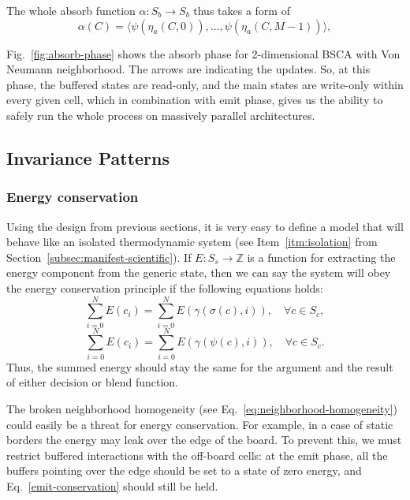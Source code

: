 \documentclass[a4paper,12pt,tikz,UTF8]{article}
\begin{document}
    The whole absorb function $\alpha: S_b \to S_b$ thus takes a form of
    \begin{equation}
      \alpha(C) = \langle \psi(\eta_a(C, 0)), ..., \psi(\eta_a(C, M - 1)) \rangle,
    \end{equation}

    Fig.~\ref{fig:absorb-phase} shows the absorb phase for 2-dimensional BSCA with Von Neumann neighborhood. The arrows are indicating the updates. So, at this phase, the buffered states are read-only, and the main states are write-only within every given cell, which in combination with emit phase, gives us the ability to safely run the whole process on massively parallel architectures.

  \subsection{Invariance Patterns}

  \subsubsection{Energy conservation}
    \label{subsec:energy-conservation}
    Using the design from previous sections, it is very easy to define a model that will behave like an isolated thermodynamic system (see Item~\ref{itm:isolation} from Section~\ref{subsec:manifest-scientific}). If $E: S_s \to \mathbb{Z}$ is a function for extracting the energy component from the generic state, then we can say the system will obey the energy conservation principle if the following equations holds:
    \begin{equation}
      \label{emit-conservation}
      \sum_{i=0}^{N}{E(c_i)} = \sum_{i=0}^{N}{E(\gamma(\sigma(c), i))}, \quad \forall c \in S_c,
    \end{equation}
    \begin{equation}
      \sum_{i=0}^{N}{E(c_i)} = \sum_{i=0}^{N}{E(\gamma(\psi(c), i))}, \quad \forall c \in S_c.
    \end{equation}
    Thus, the summed energy should stay the same for the argument and the result of either decision or blend function.

    The broken neighborhood homogeneity (see Eq.~\ref{eq:neighborhood-homogeneity}) could easily be a threat for energy conservation. For example, in a case of static borders the energy may leak over the edge of the board. To prevent this, we must restrict buffered interactions with the off-board cells: at the emit phase, all the buffers pointing over the edge should be set to a state of zero energy, and Eq.~\ref{emit-conservation} should still be held.
\end{document}
